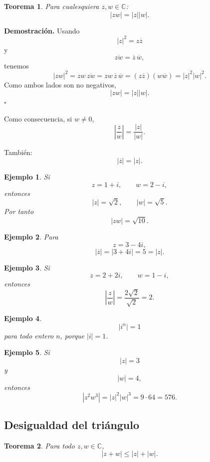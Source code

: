 \documentclass[12pt]{article}
\newtheorem{Ejem}{Ejemplo}
\newtheorem{Teo}{Teorema}
\begin{document}
\begin{Teo} 
Para cualesquiera $z,w\in\mathbb{C}$:
\[
\boxed{|zw|=|z||w|.}
\]
\end{Teo}


\textbf{Demostración.}
Usando
\[
|z|^2=z\overline z
\]
y
\[
\overline{zw}=\overline z\,\overline w,
\]
tenemos
\[
|zw|^2
=
zw\,\overline{zw}
=
zw\,\overline z\,\overline w
=
(z\overline z)(w\overline w)
=
|z|^2|w|^2.
\]
Como ambos lados son no negativos,
\[
|zw|=|z||w|.
\]
\hfill$\square$

Como consecuencia, si $w\neq0$,
\[
\boxed{
\left|\frac zw\right|
=
\frac{|z|}{|w|}.
}
\]

También:
\[
\boxed{|\overline z|=|z|.}
\]

\begin{Ejem} Si
\[
z=1+i,
\qquad
w=2-i,
\]
entonces
\[
|z|=\sqrt2,
\qquad
|w|=\sqrt5.
\]
Por tanto
\[
|zw|=\sqrt{10}.
\]

\end{Ejem}

\begin{Ejem} Para
\[
z=3-4i,
\]
\[
|\overline z|
=
|3+4i|
=
5
=
|z|.
\]

\end{Ejem}

\begin{Ejem} Si
\[
z=2+2i,
\qquad
w=1-i,
\]
entonces
\[
\left|\frac zw\right|
=
\frac{2\sqrt2}{\sqrt2}
=
2.
\]

\end{Ejem}

\begin{Ejem} \[
|i^n|=1
\]
para todo entero $n$, porque $|i|=1$.

\end{Ejem}

\begin{Ejem} Si
\[
|z|=3
\]
y
\[
|w|=4,
\]
entonces
\[
|z^2w^3|
=
|z|^2|w|^3
=
9\cdot64
=
576.
\]
\end{Ejem}


\subsection*{Desigualdad del tri\'angulo}


\begin{Teo} 
Para todo $z,w\in\mathbb{C}$,
\[
\boxed{
|z+w|
\leq
|z|+|w|.
}
\]
\end{Teo}
\end{document}
